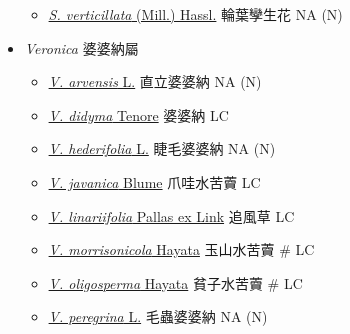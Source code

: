 \begin{itemize}
  \begin{itemize}
        \item[] \href{http://www.theplantlist.org/tpl1.1/search?q=Stemodia+verticillata}{\textit{S. verticillata} (Mill.) Hassl.}   輪葉孿生花   NA (N)
  \end{itemize}
 \item[] \textit{Veronica} 婆婆納屬
                                
  \begin{itemize}
        \item[] \href{http://www.theplantlist.org/tpl1.1/search?q=Veronica+arvensis}{\textit{V. arvensis} L.}   直立婆婆納   NA (N)
        \item[] \href{http://www.theplantlist.org/tpl1.1/search?q=Veronica+didyma}{\textit{V. didyma} Tenore}   婆婆納   LC
        \item[] \href{http://www.theplantlist.org/tpl1.1/search?q=Veronica+hederifolia}{\textit{V. hederifolia} L.}   睫毛婆婆納   NA (N)
        \item[] \href{http://www.theplantlist.org/tpl1.1/search?q=Veronica+javanica}{\textit{V. javanica} Blume}   爪哇水苦藚   LC
        \item[] \href{http://www.theplantlist.org/tpl1.1/search?q=Veronica+linariifolia}{\textit{V. linariifolia} Pallas ex Link}   追風草   LC
        \item[] \href{http://www.theplantlist.org/tpl1.1/search?q=Veronica+morrisonicola}{\textit{V. morrisonicola} Hayata}   玉山水苦藚  \# LC
        \item[] \href{http://www.theplantlist.org/tpl1.1/search?q=Veronica+oligosperma}{\textit{V. oligosperma} Hayata}   貧子水苦藚  \# LC
        \item[] \href{http://www.theplantlist.org/tpl1.1/search?q=Veronica+peregrina}{\textit{V. peregrina} L.}   毛蟲婆婆納   NA (N)

\end{itemize}
\end{itemize}
